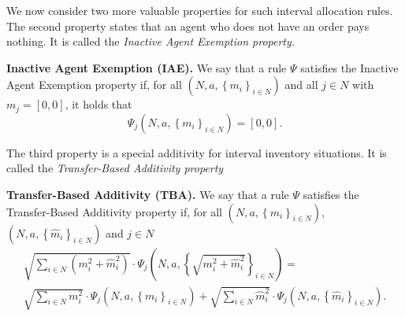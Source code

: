 \documentclass[12pt]{article}
\begin{document}
We now consider two more valuable properties for such interval allocation rules. The second property states that an agent who does not have an order pays nothing. It is called the \textit{Inactive Agent Exemption property.}




\noindent \textbf{Inactive Agent Exemption (IAE).} We say that a rule $\Psi $
satisfies the Inactive Agent Exemption property if, for all $(N,a,\left\{ m_{i}\right\}
_{i\in N})$ and all $j\in N$ with $m_{j}=\left[ 0,0\right] $, it holds that 
\begin{equation*}
\Psi _{j}(N,a,\left\{ m_{i}\right\} _{i\in N})=\left[ 0,0\right] .
\end{equation*}

\noindent The third property is a special additivity for interval inventory situations. It is called the \textit{Transfer-Based Additivity property }

\noindent \textbf{Transfer-Based Additivity (TBA).} We say that a rule $\Psi $
satisfies the Transfer-Based Additivity property if, for all $(N,a,\left\{ m_{i}\right\}
_{i\in N})$, $(N,a,\left\{ \hat{m}_{i}\right\} _{i\in N})$ and $j\in N$  
\begin{equation*}
\begin{split}
\sqrt{\sum_{i\in N}\left(m_i^2+\hat{m}_i^2\right)}\cdot \Psi_j (N,a,\left\{ 
\sqrt{m^2_{i}+\hat{m}^2_{i}}\right\} _{i\in N})= \\
\sqrt{\sum_{i\in N}m_i^2}\cdot \Psi_j (N,a,\left\{ m_{i}\right\} _{i\in N})+%
\sqrt{\sum_{i\in N}\hat{m}_i^2}\cdot \Psi_j (N,a,\left\{ \hat{m}_{i}\right\}
_{i\in N}).
\end{split}%
\end{equation*}%

\medskip
\end{document}
